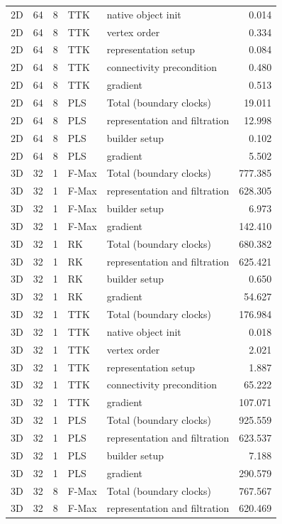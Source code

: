 \begin{tabular}{lrrllr}
2D & 64 & 8 & TTK & native object init & 0.014 \\
2D & 64 & 8 & TTK & vertex order & 0.334 \\
2D & 64 & 8 & TTK & representation setup & 0.084 \\
2D & 64 & 8 & TTK & connectivity precondition & 0.480 \\
2D & 64 & 8 & TTK & gradient & 0.513 \\
2D & 64 & 8 & PLS & Total (boundary clocks) & 19.011 \\
2D & 64 & 8 & PLS & representation and filtration & 12.998 \\
2D & 64 & 8 & PLS & builder setup & 0.102 \\
2D & 64 & 8 & PLS & gradient & 5.502 \\
3D & 32 & 1 & F-Max & Total (boundary clocks) & 777.385 \\
3D & 32 & 1 & F-Max & representation and filtration & 628.305 \\
3D & 32 & 1 & F-Max & builder setup & 6.973 \\
3D & 32 & 1 & F-Max & gradient & 142.410 \\
3D & 32 & 1 & RK & Total (boundary clocks) & 680.382 \\
3D & 32 & 1 & RK & representation and filtration & 625.421 \\
3D & 32 & 1 & RK & builder setup & 0.650 \\
3D & 32 & 1 & RK & gradient & 54.627 \\
3D & 32 & 1 & TTK & Total (boundary clocks) & 176.984 \\
3D & 32 & 1 & TTK & native object init & 0.018 \\
3D & 32 & 1 & TTK & vertex order & 2.021 \\
3D & 32 & 1 & TTK & representation setup & 1.887 \\
3D & 32 & 1 & TTK & connectivity precondition & 65.222 \\
3D & 32 & 1 & TTK & gradient & 107.071 \\
3D & 32 & 1 & PLS & Total (boundary clocks) & 925.559 \\
3D & 32 & 1 & PLS & representation and filtration & 623.537 \\
3D & 32 & 1 & PLS & builder setup & 7.188 \\
3D & 32 & 1 & PLS & gradient & 290.579 \\
3D & 32 & 8 & F-Max & Total (boundary clocks) & 767.567 \\
3D & 32 & 8 & F-Max & representation and filtration & 620.469 \\

\end{tabular}

